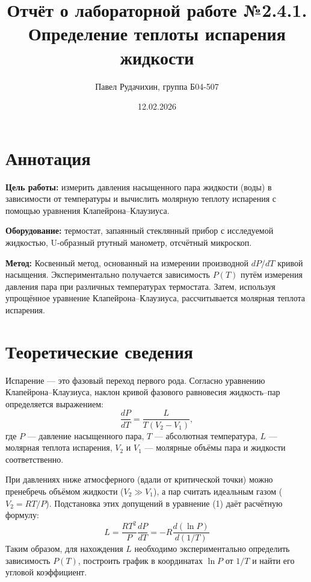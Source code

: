 \documentclass{article}
\title{Отчёт о лабораторной работе №2.4.1. \\ Определение теплоты испарения жидкости}
\author{Павел Рудачихин, группа Б04-507}
\date{12.02.2026}
\begin{document}
\maketitle

	
\section*{Аннотация}
	
	\hspace{4mm} \textbf{Цель работы:} измерить давления насыщенного пара жидкости (воды) в зависимости от температуры и вычислить молярную теплоту испарения с помощью уравнения Клапейрона–Клаузиуса.
	
	\textbf{Оборудование:} термостат, запаянный стеклянный прибор с исследуемой жидкостью, U-образный ртутный манометр, отсчётный микроскоп.
	
	\textbf{Метод:} Косвенный метод, основанный на измерении производной \(dP/dT\) кривой насыщения. Экспериментально получается зависимость \(P(T)\) путём измерения давления пара при различных температурах термостата. Затем, используя упрощённое уравнение Клапейрона–Клаузиуса, рассчитывается молярная теплота испарения.
	
\section*{Теоретические сведения}
	
	\hspace{4mm} Испарение — это фазовый переход первого рода. Согласно уравнению Клапейрона–Клаузиуса, наклон кривой фазового равновесия жидкость–пар определяется выражением:
	\begin{equation}
		\frac{dP}{dT} = \frac{L}{T(V_2 - V_1)},
	\end{equation}
	где \(P\) — давление насыщенного пара, \(T\) — абсолютная температура, \(L\) — молярная теплота испарения, \(V_2\) и \(V_1\) — молярные объёмы пара и жидкости соответственно.
	
	При давлениях ниже атмосферного (вдали от критической точки) можно пренебречь объёмом жидкости (\(V_2 \gg V_1\)), а пар считать идеальным газом (\(V_2 = RT/P\)). Подстановка этих допущений в уравнение (1) даёт расчётную формулу:
	\begin{equation}
		L = \frac{RT^2}{P} \frac{dP}{dT} = -R \frac{d(\ln P)}{d(1/T)} \label{eq:final}
	\end{equation}
	Таким образом, для нахождения \(L\) необходимо экспериментально определить зависимость \(P(T)\), построить график в координатах \(\ln P\) от \(1/T\) и найти его угловой коэффициент.
	
\end{document}
